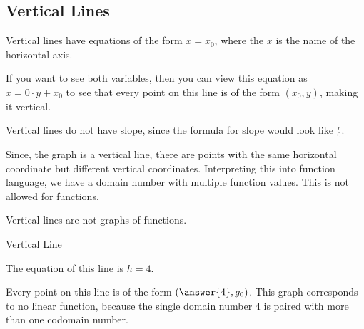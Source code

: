 \documentclass{ximera}
\begin{document}
\subsection*{Vertical Lines} 


Vertical lines have equations of the form $x = x_0$, where the $x$ is the name of the horizontal axis. 

If you want to see both variables, then you can view this equation as $x = 0 \cdot y + x_0$ to see that every point on this line is of the form $(x_0,y)$, making it vertical.

Vertical lines do not have slope, since the formula for slope would look like $\frac{r}{0}$.


Since, the graph is a vertical line, there are points with the same horizontal coordinate but different vertical coordinates. Interpreting this into function language, we have a domain number with multiple function values. This is not allowed for functions.

Vertical lines are not graphs of functions.



\begin{example} Vertical Line


The equation of this line is $h=4$. 

\begin{image}
\end{image}

Every point on this line is of the form $\left(\answer{4}, g_0\right)$. This graph corresponds to no linear function, because the single domain number $4$ is paired with more than one codomain number.


\end{example}
\end{document}
